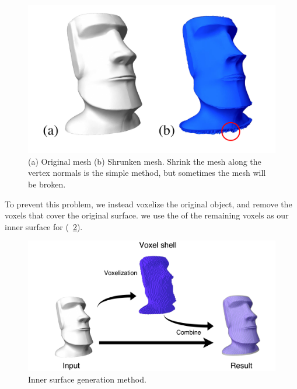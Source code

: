 \begin{figure}[ht]
\centering
\includegraphics[width=1.0\linewidth]{figs/Shrink_mesh.pdf} 
\caption{
(a) Original mesh (b) Shrunken mesh. Shrink the mesh along the vertex normals is the simple method, but sometimes the mesh will be broken.}
\label{fig:shrink_mesh}
\end{figure}
To prevent this problem, we instead voxelize the original object, and remove the voxels that cover the original surface.
 we use the  of the remaining voxels as our inner surface for (\figname~\ref{fig:inner_surface}).

\begin{figure}[ht]
\centering
\includegraphics[width=1.0\linewidth]{figs/inner2.pdf} 
\caption{Inner surface generation method.}
\label{fig:inner_surface}
\end{figure}

